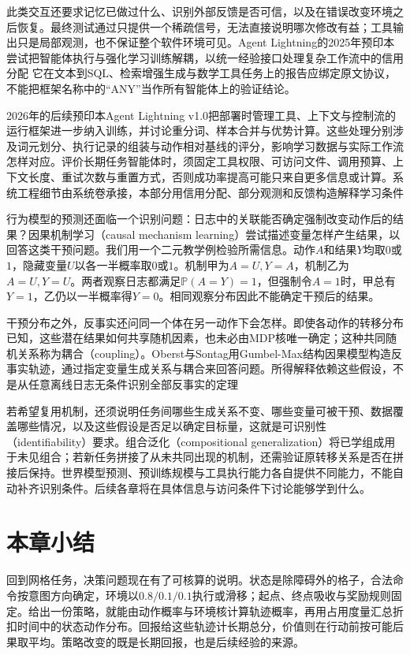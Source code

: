 此类交互还要求记忆已做过什么、识别外部反馈是否可信，以及在错误改变环境之后恢复。最终测试通过只提供一个稀疏信号，无法直接说明哪次修改有益；工具输出只是局部观测，也不保证整个软件环境可见。Agent Lightning的2025年预印本尝试把智能体执行与强化学习训练解耦，以统一经验接口处理复杂工作流中的信用分配
它在文本到SQL、检索增强生成与数学工具任务上的报告应绑定原文协议，不能把框架名称中的“ANY”当作所有智能体上的验证结论。

2026年的后续预印本Agent Lightning v1.0把部署时管理工具、上下文与控制流的运行框架进一步纳入训练，并讨论重分词、样本合并与优势计算。这些处理分别涉及词元划分、执行记录的组装与动作相对基线的评分，影响学习数据与实际工作流怎样对应。评价长期任务智能体时，须固定工具权限、可访问文件、调用预算、上下文长度、重试次数与重置方式，否则成功率提高可能只来自更多信息或计算。系统工程细节由系统卷承接，本部分用信用分配、部分观测和反馈构造解释学习条件

行为模型的预测还面临一个识别问题：日志中的关联能否确定强制改变动作后的结果？因果机制学习（causal mechanism learning）尝试描述变量怎样产生结果，以回答这类干预问题。我们用一个二元教学例检验所需信息。动作$A$和结果$Y$均取$0$或$1$，隐藏变量$U$以各一半概率取$0$或$1$。机制甲为$A=U,Y=A$，机制乙为$A=U,Y=U$。两者观察日志都满足$\mathbb P(A=Y)=1$，但强制令$A=1$时，甲总有$Y=1$，乙仍以一半概率得$Y=0$。相同观察分布因此不能确定干预后的结果。

干预分布之外，反事实还问同一个体在另一动作下会怎样。即使各动作的转移分布已知，这些潜在结果如何共享随机因素，也未必由MDP核唯一确定；这种共同随机关系称为耦合（coupling）。Oberst与Sontag用Gumbel-Max结构因果模型构造反事实轨迹，通过指定变量生成关系与耦合来回答问题。所得解释依赖这些假设，不是从任意离线日志无条件识别全部反事实的定理

若希望复用机制，还须说明任务间哪些生成关系不变、哪些变量可被干预、数据覆盖哪些情况，以及这些假设是否足以确定目标量，这就是可识别性（identifiability）要求。组合泛化（compositional generalization）将已学组成用于未见组合；若新任务拼接了从未共同出现的机制，还需验证原转移关系是否在拼接后保持。世界模型预测、预训练规模与工具执行能力各自提供不同能力，不能自动补齐识别条件。后续各章将在具体信息与访问条件下讨论能够学到什么。

\section{本章小结}
\label{sec:rl-overview-summary}

回到网格任务，决策问题现在有了可核算的说明。状态是除障碍外的格子，合法命令按意图方向确定，环境以$0.8/0.1/0.1$执行或滑移；起点、终点吸收与奖励规则固定。给出一份策略，就能由动作概率与环境核计算轨迹概率，再用占用度量汇总折扣时间中的状态动作分布。回报给这些轨迹计长期总分，价值则在行动前按可能后果取平均。策略改变的既是长期回报，也是后续经验的来源。

